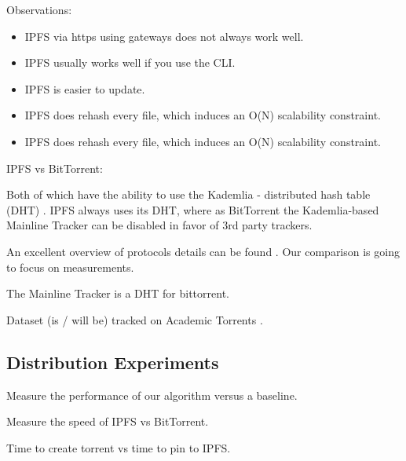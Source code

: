 \documentclass[10pt,twocolumn,letterpaper]{article}
\begin{document}
Observations:
\begin{itemize}
    \item IPFS via https using gateways does not always work well.
    \item IPFS usually works well if you use the CLI.
    \item IPFS is easier to update.
    \item IPFS does rehash every file, which induces an O(N) scalability constraint.
    \item IPFS does rehash every file, which induces an O(N) scalability constraint.
\end{itemize}


IPFS vs BitTorrent:

Both of which have the ability to use the Kademlia - distributed hash table (DHT) \cite{maymounkov_kademlia_2002}.
IPFS always uses its DHT, where as BitTorrent the Kademlia-based Mainline
Tracker can be disabled in favor of 3rd party trackers.

An excellent overview of protocols details can be found \cite{zebedee_comparing_2023}.
Our comparison is going to focus on measurements.



The Mainline Tracker is a DHT for bittorrent.



Dataset (is / will be) tracked on Academic Torrents \cite{academic_torrents_Cohen2014}.


\subsection{Distribution Experiments}

Measure the performance of our algorithm versus a baseline.

Measure the speed of IPFS vs BitTorrent.

Time to create torrent vs time to pin to IPFS.
\end{document}
